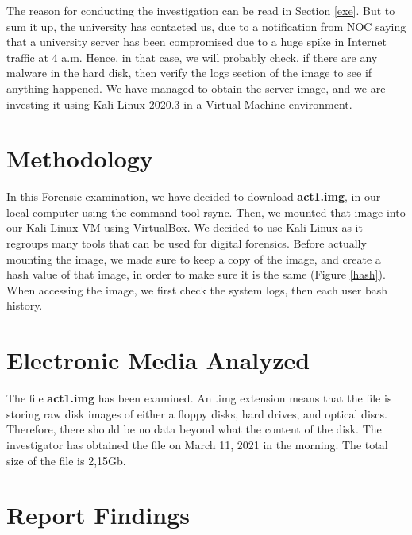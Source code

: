 \documentclass[a4paper,12pt]{article}
\begin{document}
The reason for conducting the investigation can be read in Section \ref{exe}. But to sum it up, the university has contacted us, due to a notification from NOC saying that a university server has been compromised due to a huge spike in Internet traffic at 4 a.m. Hence, in that case, we will probably check, if there are any malware in the hard disk, then verify the logs section of the image to see if anything happened. We have managed to obtain the server image, and we are investing it using Kali Linux 2020.3 in a Virtual Machine environment.

\section{Methodology}


In this Forensic examination, we have decided to download \textbf{act1.img}, in our local computer using the command tool rsync. Then, we mounted that image into our Kali Linux VM using VirtualBox. We decided to use Kali Linux as it regroups many tools that can be used for digital forensics. Before actually mounting the image, we made sure to keep a copy of the image, and create a hash value of that image, in order to make sure it is the same (Figure \ref{hash}). When accessing the image, we first check the system logs, then each user bash history. 
 
\section{Electronic Media Analyzed}
The file \textbf{act1.img} has been examined. An .img extension means that the file is storing raw disk images of either a floppy disks, hard drives, and optical discs. Therefore, there should be no data beyond what the content of the disk. The investigator has obtained the file on March 11, 2021 in the morning. The total size of the file is 2,15Gb. 
 
\section{Report Findings}
\end{document}
